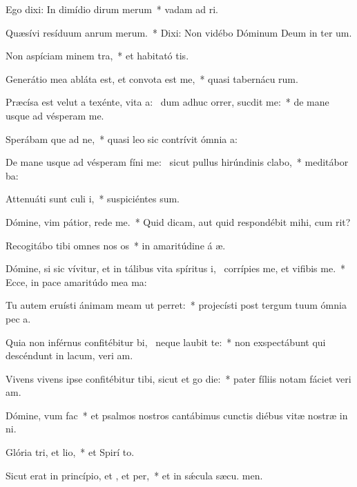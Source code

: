 \item Ego dixi: In dimídio dirum merum~* vadam ad  ri.
\item Quæsívi resíduum anrum merum.~* Dixi: Non vidébo Dóminum Deum in ter um.
\item Non aspíciam minem tra,~* et habitató tis.
\item Generátio mea abláta est, et convota est  me,~* quasi tabernácu rum.
\item Præcísa est velut a texénte, vita a:~\pscross{} dum adhuc orrer, sucdit me:~* de mane usque ad vésperam  me.
\item Sperábam que ad ne,~* quasi leo sic contrívit ómnia  a:
\item De mane usque ad vésperam fíni me:~\pscross{} sicut pullus hirúndinis  clabo,~* meditábor  ba:
\item Attenuáti sunt culi i,~* suspiciéntes  sum.
\item Dómine, vim pátior, rede  me.~* Quid dicam, aut quid respondébit mihi, cum  rit?
\item Recogitábo tibi omnes nos os~* in amaritúdine á æ.
\item Dómine, si sic vívitur, et in tálibus vita spíritus i,~\pscross{} corrípies me, et vifibis me.~* Ecce, in pace amaritúdo mea ma:
\item Tu autem eruísti ánimam meam ut  perret:~* projecísti post tergum tuum ómnia pec a.
\item Quia non inférnus confitébitur bi,~\pscross{} neque  laubit te:~* non exspectábunt qui descéndunt in lacum, veri am.
\item Vivens vivens ipse confitébitur tibi, sicut et go die:~* pater fíliis notam fáciet veri am.
\item Dómine, vum  fac~* et psalmos nostros cantábimus cunctis diébus vitæ nostræ in  ni.
\item Glória tri, et lio,~* et Spirí to.
\item Sicut erat in princípio, et , et per,~* et in sǽcula sæcu. men.
